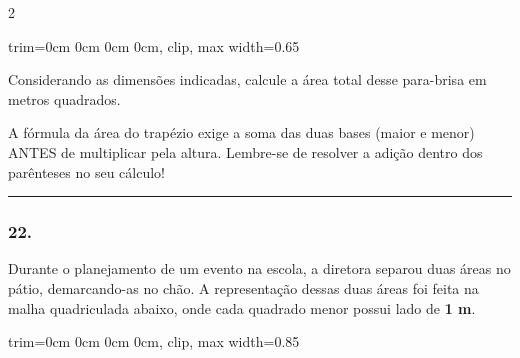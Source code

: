 \documentclass[twoside, 10pt, a4paper]{article}
\newlength{\espacoPreQuestao}\setlength{\espacoPreQuestao}{0.1cm}
\newlength{\espacoQuestao}\setlength{\espacoQuestao}{0.2cm}
\newcommand{\larguraTikz}{0.85\linewidth}
\begin{document}
\begin{multicols*}{2}
\begin{center}
\begin{adjustbox}{trim=0cm 0cm 0cm 0cm, clip, max width=0.65\linewidth}
\end{adjustbox}
\end{center}

Considerando as dimensões indicadas, calcule a área total desse para-brisa em metros quadrados. 
\par\vspace{\espacoQuestao}

\begin{boxdica}
A fórmula da área do trapézio exige a soma das duas bases (maior e menor) ANTES de multiplicar pela altura. Lembre-se de resolver a adição dentro dos parênteses no seu cálculo!
\end{boxdica}

\noindent\textcolor{CorLinha}{\rule{\linewidth}{0.5pt}} 
\par\vspace{\espacoPreQuestao}
\subsubsection*{22.} Durante o planejamento de um evento na escola, a diretora separou duas áreas no pátio, demarcando-as no chão. A representação dessas duas áreas foi feita na malha quadriculada abaixo, onde cada quadrado menor possui lado de \textbf{1 m}.

\begin{center}
\begin{adjustbox}{trim=0cm 0cm 0cm 0cm, clip, max width=0.85\linewidth}
\end{adjustbox}
\end{center}
\end{multicols*}
\end{document}
